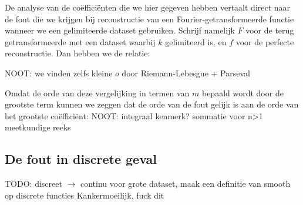 De analyse van de co\"effici\"enten die we hier gegeven hebben vertaalt direct naar de fout die we krijgen
bij reconstructie van een Fourier-getransformeerde functie wanneer we een gelimiteerde dataset gebruiken.
Schrijf namelijk $F$ voor de terug getransformeerde met een dataset waarbij $k$ gelimiteerd is, en $f$ voor
de perfecte reconstructie. Dan hebben we de relatie:

NOOT: we vinden zelfs kleine $o$ door Riemann-Lebesgue + Parseval

Omdat de orde van deze vergelijking in termen van $m$ bepaald wordt door de grootste term kunnen we zeggen 
dat de orde van de fout gelijk is aan de orde van het grootste co\"effici\"ent:
NOOT: integraal kenmerk? sommatie voor n>1 meetkundige reeks

\subsection{De fout in discrete geval}

TODO: discreet $\to$ continu voor grote dataset, maak een definitie van smooth op discrete functies
Kankermoeilijk, fuck dit

